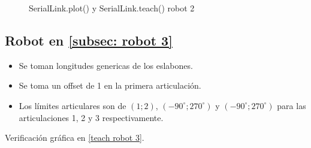 \documentclass[a4paper,12pt]{article}
\begin{document}
\begin{figure}[htpb]
    \centering
    \begin{adjustbox}{max width=\columnwidth}
    \end{adjustbox}
    \caption{SerialLink.plot() y SerialLink.teach() robot 2}
    \label{teach robot 2}
\end{figure}

\subsection{Robot en \cref{subsec: robot 3}}
\begin{itemize}
    \item Se toman longitudes genericas de los eslabones.
    \item Se toma un offset de 1 en la primera articulación.
    \item Los límites articulares son de $\left(1; 2\right)$, $\left(-90^\circ; 270^\circ\right)$ y $\left(-90^\circ; 270^\circ\right)$ para las articulaciones 1, 2 y 3 respectivamente.
\end{itemize}

Verificación gráfica en \cref{teach robot 3}.
\end{document}
